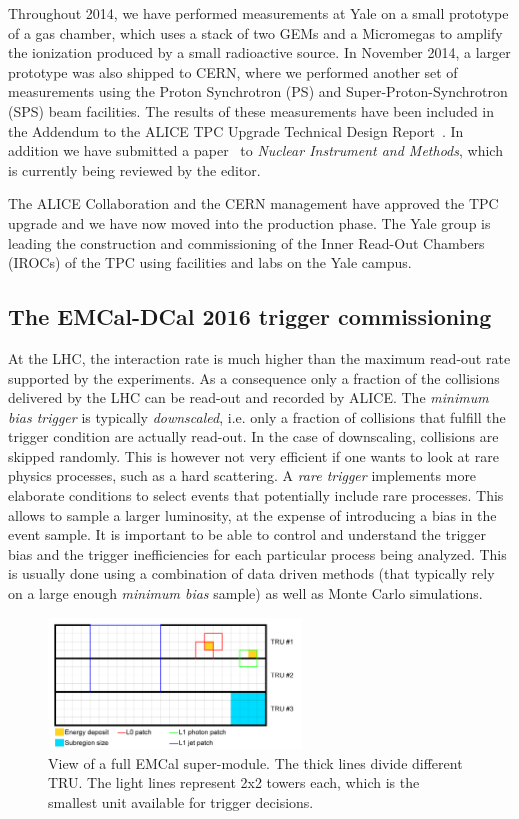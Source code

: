 \documentclass[12pt, a4paper, twoside, titlepage]{article}
\begin{document}
Throughout 2014, we have performed measurements at Yale on a small prototype of a gas chamber, which uses a stack of two GEMs and a Micromegas to amplify the ionization
produced by a small radioactive source. In November 2014, a larger prototype was also shipped to CERN, where we performed another set of measurements using
the Proton Synchrotron (PS) and Super-Proton-Synchrotron (SPS) beam facilities.
The results of these measurements have been included in the Addendum to the ALICE TPC Upgrade Technical Design Report~\cite{ALICE:2015b}.
In addition we have submitted a paper~\cite{Aiola:2016a} to \emph{Nuclear Instrument and Methods}, which is currently being reviewed by the editor.

The ALICE Collaboration and the CERN management have approved the TPC upgrade and we have now moved into the production phase.
The Yale group is leading the construction and commissioning of the Inner Read-Out Chambers (IROCs) of the TPC using facilities and labs on the Yale campus.

\subsection{The EMCal-DCal 2016 trigger commissioning}
\label{sect:TriggerCommisioning}
At the LHC, the interaction rate is much higher than the maximum read-out rate supported by the experiments. As a consequence only a fraction of the collisions delivered
by the LHC can be read-out and recorded by ALICE. The \emph{minimum bias trigger} is typically \emph{downscaled}, i.e. only a fraction of collisions
that fulfill the trigger condition are actually read-out. In the case of downscaling, collisions are skipped randomly. This is however not very efficient
if one wants to look at rare physics processes, such as a hard scattering. A \emph{rare trigger} implements more elaborate conditions to select events that 
potentially include rare processes. This allows to sample a larger luminosity, at the expense of introducing a bias in the event sample. It is important
to be able to control and understand the trigger bias and the trigger inefficiencies for each particular process being analyzed. This is usually done
using a combination of data driven methods (that typically rely on a large enough \emph{minimum bias} sample) as well as Monte Carlo simulations.

\begin{figure}[tb]
\begin{center}
\includegraphics[width=0.6\textwidth]{img/emcaltrigger}
 \caption{View of a full EMCal super-module. The thick lines divide different TRU. The light lines represent 2x2 towers each, which is the smallest unit
available for trigger decisions.} 
 \label{fig:emcaltrigger}
\end{center}
\end{figure}
\end{document}
